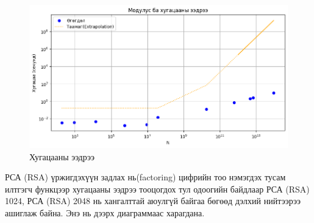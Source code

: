 	\begin{figure}[h]
		\centering
		\includegraphics[scale=0.73]{assets/rsacomplexity.png}
		\caption{Хугацааны ээдрээ}
		\label{fig:rsacomplexity}
	\end{figure}

РСА (RSA) үржигдэхүүн задлах нь(factoring) цифрийн тоо нэмэгдэх тусам илтгэгч функцээр хугацааны ээдрээ тооцогдох тул одоогийн байдлаар РСА (RSA) 1024, РСА (RSA) 2048 нь хангалттай аюулгүй байгаа бөгөөд дэлхий нийтээрээ ашиглаж байна. Энэ нь дээрх диаграммаас харагдана.
